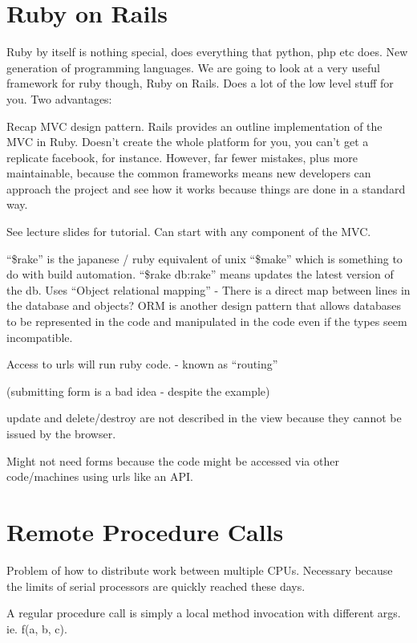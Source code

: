 \documentclass[11pt]{article}
\begin{document}
\section{Ruby on Rails}

Ruby by itself is nothing special, does everything that python, php etc does. New generation of programming languages. We are going to look at a very useful framework for ruby though, Ruby on Rails. Does a lot of the low level stuff for you. Two advantages:
 
 

Recap MVC design pattern. Rails provides an outline implementation of the MVC in Ruby. Doesn’t create the whole platform for you, you can’t get a replicate facebook, for instance. However, far fewer mistakes, plus more maintainable, because the common frameworks means new developers can approach the project and see how it works because things are done in a standard way.

See lecture slides for tutorial. Can start with any component of the MVC.

``\$rake'' is the japanese / ruby equivalent of unix ``\$make'' which is something to do with build automation.
``\$rake db:rake'' means updates the latest version of the db. Uses ``Object relational mapping'' - There is a direct map between lines in the database and objects? ORM is another design pattern that allows databases to be represented in the code and manipulated in the code even if the types seem incompatible.

Access to urls will run ruby code. - known as ``routing''

(submitting form is a bad idea - despite the example)

update and delete/destroy are not described in the view because they cannot be issued by the browser.

Might not need forms because the code might be accessed via other code/machines using urls like an API.

\section{Remote Procedure Calls}
\label{sec:RPC}

Problem of how to distribute work between multiple CPUs. Necessary because the limits of serial processors are quickly reached these days.

A regular procedure call is simply a local method invocation with different args. ie. f(a, b, c).
\end{document}
